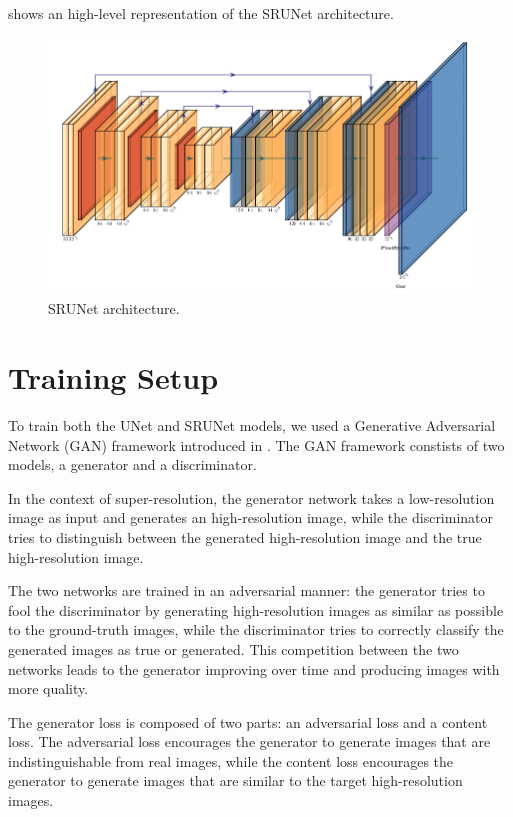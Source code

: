  shows an high-level representation of the SRUNet architecture.

\begin{figure}[h]
\centering
\includegraphics[width=1.0\textwidth]{static/srunet_architecture.png}
\caption{SRUNet architecture.}
\label{fig:srunet}
\end{figure}

\section{Training Setup}
\label{sec:training-setup}

To train both the UNet and SRUNet models, we used a Generative Adversarial Network (GAN) framework introduced in \cite{goodfellow2020generative}. The GAN framework constists of two models, a generator and a discriminator.

In the context of super-resolution, the generator network takes a low-resolution image as input and generates an high-resolution image, while the discriminator tries to distinguish between the generated high-resolution image and the true high-resolution image.

The two networks are trained in an adversarial manner: the generator tries to fool the discriminator by generating high-resolution images as similar as possible to the ground-truth images, while the discriminator tries to correctly classify the generated images as true or generated. This competition between the two networks leads to the generator improving over time and producing images with more quality.

The generator loss is composed of two parts: an adversarial loss and a content loss. The adversarial loss encourages the generator to generate images that are indistinguishable from real images, while the content loss encourages the generator to generate images that are similar to the target high-resolution images.

